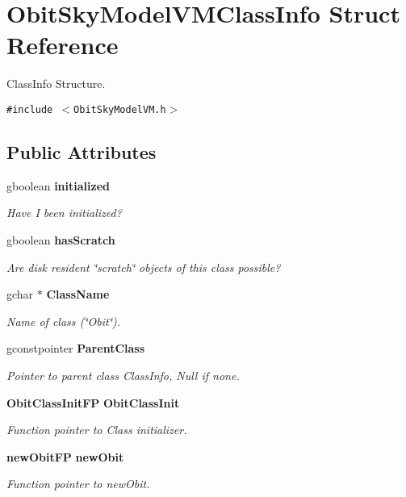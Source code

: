 \section{Obit\-Sky\-Model\-VMClass\-Info Struct Reference}
\label{structObitSkyModelVMClassInfo}
Class\-Info Structure.  


{\tt \#include $<$Obit\-Sky\-Model\-VM.h$>$}

\subsection*{Public Attributes}
\begin{CompactItemize}
\item 
gboolean {\bf initialized}
\begin{CompactList}\small\item\em Have I been initialized? \item\end{CompactList}\item 
gboolean {\bf has\-Scratch}
\begin{CompactList}\small\item\em Are disk resident \char`\"{}scratch\char`\"{} objects of this class possible? \item\end{CompactList}\item 
gchar $\ast$ {\bf Class\-Name}
\begin{CompactList}\small\item\em Name of class (\char`\"{}Obit\char`\"{}). \item\end{CompactList}\item 
gconstpointer {\bf Parent\-Class}
\begin{CompactList}\small\item\em Pointer to parent class Class\-Info, Null if none. \item\end{CompactList}\item 
{\bf Obit\-Class\-Init\-FP} {\bf Obit\-Class\-Init}
\begin{CompactList}\small\item\em Function pointer to Class initializer. \item\end{CompactList}\item 
{\bf new\-Obit\-FP} {\bf new\-Obit}
\begin{CompactList}\small\item\em Function pointer to new\-Obit. \item\end{CompactList}\item 

\end{CompactItemize}
